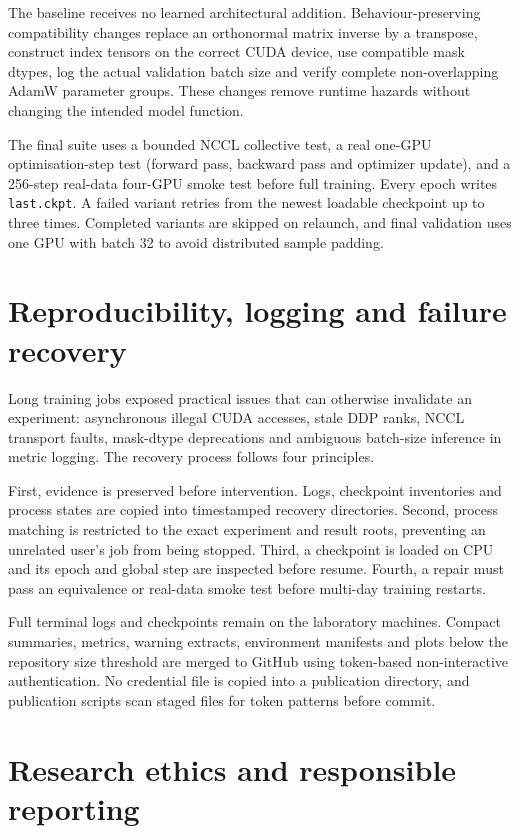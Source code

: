 The baseline receives no learned architectural addition. Behaviour-preserving compatibility changes replace an orthonormal matrix inverse by a transpose, construct index tensors on the correct CUDA device, use compatible mask dtypes, log the actual validation batch size and verify complete non-overlapping AdamW parameter groups. These changes remove runtime hazards without changing the intended model function.

The final suite uses a bounded NCCL collective test, a real one-GPU optimisation-step test (forward pass, backward pass and optimizer update), and a 256-step real-data four-GPU smoke test before full training. Every epoch writes \texttt{last.ckpt}. A failed variant retries from the newest loadable checkpoint up to three times. Completed variants are skipped on relaunch, and final validation uses one GPU with batch 32 to avoid distributed sample padding.

\section{Reproducibility, logging and failure recovery}

Long training jobs exposed practical issues that can otherwise invalidate an experiment: asynchronous illegal CUDA accesses, stale DDP ranks, NCCL transport faults, mask-dtype deprecations and ambiguous batch-size inference in metric logging. The recovery process follows four principles.

First, evidence is preserved before intervention. Logs, checkpoint inventories and process states are copied into timestamped recovery directories. Second, process matching is restricted to the exact experiment and result roots, preventing an unrelated user's job from being stopped. Third, a checkpoint is loaded on CPU and its epoch and global step are inspected before resume. Fourth, a repair must pass an equivalence or real-data smoke test before multi-day training restarts.

Full terminal logs and checkpoints remain on the laboratory machines. Compact summaries, metrics, warning extracts, environment manifests and plots below the repository size threshold are merged to GitHub using token-based non-interactive authentication. No credential file is copied into a publication directory, and publication scripts scan staged files for token patterns before commit.

\section{Research ethics and responsible reporting}

